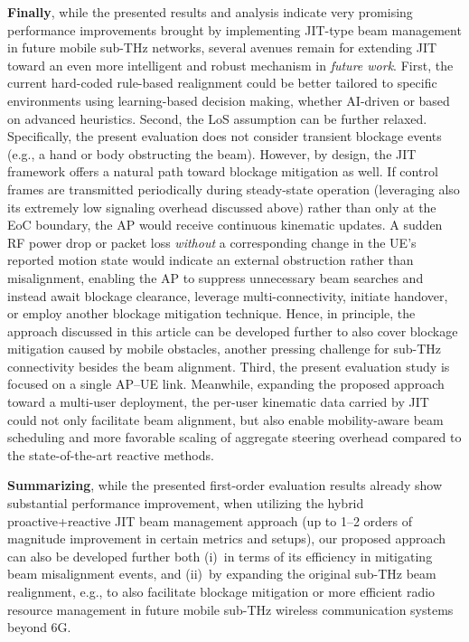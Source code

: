 \documentclass[fleqn,10pt]{wlscirep}
\begin{document}
\textbf{Finally}, while the presented results and analysis indicate very promising performance improvements brought by implementing JIT-type beam management in future mobile sub-THz networks, several avenues remain for extending JIT toward an even more intelligent and robust mechanism in \emph{future work}. First, the current hard-coded rule-based realignment could be better tailored to specific environments using learning-based decision making\cite{10036372}, whether AI-driven or based on advanced heuristics. Second, the LoS assumption can be further relaxed. Specifically, the present evaluation does not consider transient blockage events (e.g., a hand or body obstructing the beam). However, by design, the JIT framework offers a natural path toward blockage mitigation as well. If control frames are transmitted periodically during steady-state operation (leveraging also its extremely low signaling overhead discussed above) rather than only at the EoC boundary, the AP would receive continuous kinematic updates. A sudden RF power drop or packet loss \emph{without} a corresponding change in the UE's reported motion state would indicate an external obstruction rather than misalignment, enabling the AP to suppress unnecessary beam searches and instead await blockage clearance, leverage multi-connectivity, initiate handover, or employ another blockage mitigation technique. Hence, in principle, the approach discussed in this article can be developed further to also cover blockage mitigation caused by mobile obstacles, another pressing challenge for sub-THz connectivity besides the beam alignment. Third, the present evaluation study is focused on a single AP--UE link. Meanwhile, expanding the proposed approach toward a multi-user deployment, the per-user kinematic data carried by JIT could not only facilitate beam alignment, but also enable mobility-aware beam scheduling and more favorable scaling of aggregate steering overhead compared to the state-of-the-art reactive methods.

\textbf{Summarizing}, while the presented first-order evaluation results already show substantial performance improvement, when utilizing the hybrid proactive+reactive JIT beam management approach (up to 1--2 orders of magnitude improvement in certain metrics and setups), our proposed approach can also be developed further both (i)~in terms of its efficiency in mitigating beam misalignment events, and (ii)~by expanding the original sub-THz beam realignment, e.g., to also facilitate blockage mitigation or more efficient radio resource management in future mobile sub-THz wireless communication systems beyond 6G.
\end{document}
